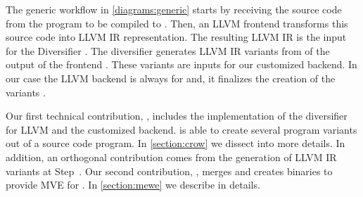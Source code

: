 The generic workflow in \autoref{diagrams:generic} starts by receiving the source code from the program to be compiled to \wasm. Then, an LLVM frontend transforms this source code into LLVM IR representation. The resulting LLVM IR is the input for the Diversifier .  
The diversifier generates LLVM IR variants from of the output of the frontend . These variants are inputs for our customized backend. In our case the LLVM backend is always for \wasm and, it finalizes the creation of the variants . 

Our first technical contribution,  \cite{CROW}, includes the implementation of the diversifier for LLVM and the customized \wasm backend. is able to create several \wasm program variants out of a source code program. In \autoref{section:crow} we dissect into more details.
In addition, an orthogonal contribution comes from the generation of LLVM IR variants at Step~. Our second contribution,  \cite{MEWE}, merges and creates binaries to provide MVE for \wasm {}. In \autoref{section:mewe} we describe in details.

